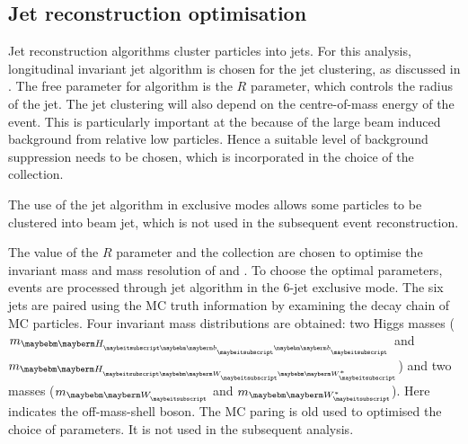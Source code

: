 \subsection{Jet reconstruction optimisation}
\label{sec:doubleHiggsJetOptimisation}

Jet reconstruction algorithms cluster particles into jets. For this analysis, longitudinal invariant \kt jet algorithm is chosen for the jet clustering, as discussed in . The free parameter for \kt algorithm is the $R$ parameter, which controls the radius of the jet. The jet clustering will also depend on the centre-of-mass energy of the event. This is particularly important at the \CLIC because of the large beam induced background from relative low  \pT particles. Hence a suitable level of background suppression needs to be chosen, which is incorporated in the choice of the \PFO  collection.


The use of the \kt jet algorithm in exclusive modes allows some particles to be clustered into beam jet, which is not used in the subsequent event reconstruction.

The value of the $R$ parameter and the \PFO collection are chosen to optimise the invariant mass and mass resolution of \PHiggs and \PW. To choose the optimal parameters, \eeToHHbbWWHad events  are processed through \kt jet algorithm  in the 6-jet exclusive mode. The six jets are paired using the MC truth information by examining the decay chain of MC particles. Four invariant mass distributions are obtained: two Higgs masses ($m_{\Hbb}$ and $m_{\HWW}$) and two \PW masses ($m_{\PW}$ and $m_{\W*}$). Here \W* indicates the off-mass-shell \PW boson. The MC paring is old used to optimised the choice of parameters. It is not used in the subsequent analysis.



